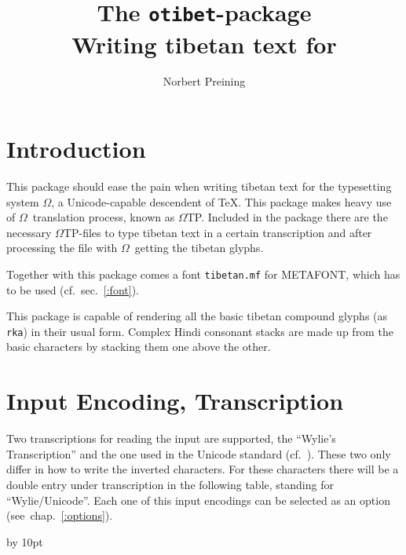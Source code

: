 \documentclass{article}
\title{The \texttt{otibet}-package\\
 Writing tibetan text for \OMEGA}
\author{Norbert Preining}
\def\oo{$\Omega$}
\def\otp{\oo TP}
\let\OMEGA=\oo
\def\METAFONT{{\logofont METAFONT}}
\begin{document}
\maketitle

\section{Introduction}
This package should ease the pain when writing tibetan text for the
typesetting system \OMEGA, a Unicode-capable descendent of
\TeX. This package makes heavy use of \oo\ translation process,
known as \otp. Included in the package there are the necessary
\otp-files to type tibetan text in a certain transcription and after
processing the file with \oo\ getting the tibetan glyphs.

Together with this package comes a font \texttt{tibetan.mf} for
\METAFONT, which has to be used (cf.~sec.~\ref{:font}).

This package is capable of rendering all the basic tibetan
compound glyphs (as \texttt{rka}) in their usual form. Complex Hindi
consonant stacks are made up from the basic characters by stacking
them one above the other.

\section{Input Encoding, Transcription\label{:trans}}
Two transcriptions for reading the input are supported, the ``Wylie's
Transcription'' and the one used in the Unicode standard
(cf.~\cite{unicode}). These two only differ in how to write the
inverted characters. For these characters there will be a double entry
under transcription in the following table, standing for
``Wylie/Unicode''. Each one of this input encodings can be selected as
an option (see~chap.~\ref{:options}).

{
\columnseprule=0.5pt
\advance\baselineskip by 10pt
\begin{multicols}{3}
\end{multicols}
\par}
\end{document}
